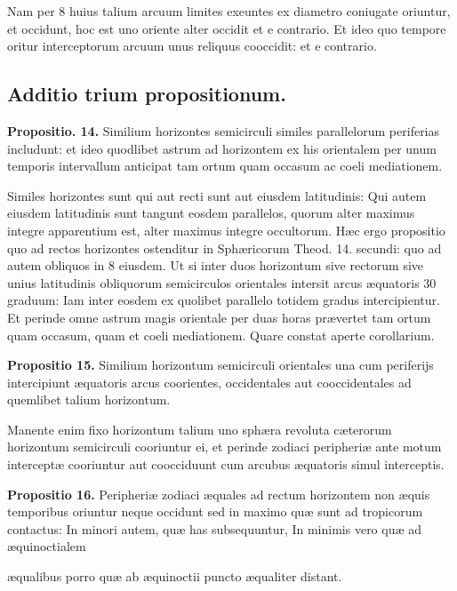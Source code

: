 \documentclass[11pt,a4paper]{article}
\begin{document}
Nam per 8 huius talium arcuum limites exeuntes ex diametro coniugate oriuntur, et occidunt, hoc est  uno oriente alter occidit et e contrario. Et ideo quo tempore oritur interceptorum arcuum unus reliquus cooccidit: et e contrario.

\subsection*{Additio trium propositionum.}

\textbf{Propositio. 14.} Similium horizontes semicirculi similes parallelorum periferias includunt: et ideo quodlibet astrum ad horizontem ex his orientalem per unum temporis intervallum anticipat tam ortum quam occasum ac coeli mediationem.

Similes horizontes sunt qui aut recti sunt aut eiusdem latitudinis: Qui autem eiusdem latitudinis sunt tangunt eosdem parallelos, quorum alter maximus integre apparentium est, alter maximus integre occultorum. Hæc ergo propositio quo ad rectos horizontes ostenditur in Sphæricorum Theod. 14. secundi: quo ad autem obliquos in 8 eiusdem. Ut si inter duos horizontum sive rectorum sive unius latitudinis obliquorum semicirculos orientales intersit arcus æquatoris 30 graduum: Iam inter eosdem ex quolibet parallelo totidem gradus intercipientur. Et perinde omne astrum magis orientale per duas horas prævertet tam ortum quam occasum, quam et coeli mediationem. Quare constat aperte corollarium.

\textbf{Propositio 15.} Similium horizontum semicirculi orientales una cum periferijs intercipiunt æquatoris arcus coorientes, occidentales aut cooccidentales ad quemlibet talium horizontum.

Manente enim fixo horizontum talium uno sphæra revoluta cæterorum horizontum semicirculi cooriuntur ei, et perinde zodiaci peripheriæ ante motum interceptæ cooriuntur aut coocciduunt cum arcubus æquatoris simul interceptis.

\textbf{Propositio 16.} Peripheriæ zodiaci æquales ad rectum horizontem non æquis temporibus oriuntur neque occidunt sed in maximo quæ sunt ad tropicorum contactus: In minori autem, quæ has subsequuntur, In minimis vero quæ ad æquinoctialem

æqualibus porro quæ ab æquinoctii puncto æqualiter distant.
\end{document}
